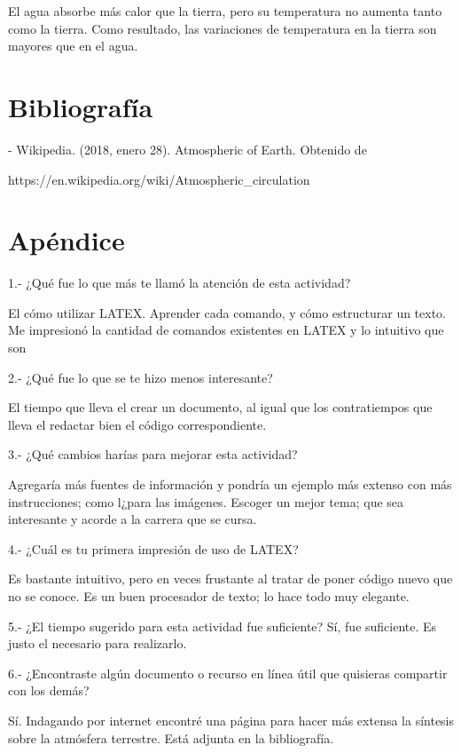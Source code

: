 \documentclass{article} %
\begin{document}
El agua absorbe más calor que la tierra, pero su temperatura no aumenta tanto como la tierra. Como resultado, las variaciones de temperatura en la tierra son mayores que en el agua.



\section{Bibliografía}

- Wikipedia. (2018, enero 28). Atmospheric of Earth. Obtenido de

https://en.wikipedia.org/wiki/Atmospheric\_circulation


\section{Apéndice}



1.- ¿Qué fue lo que más te llamó la atención de esta actividad?

         {\color{red}El cómo utilizar LATEX. Aprender cada comando, y cómo estructurar un texto. Me impresionó la cantidad de comandos existentes en LATEX y lo intuitivo que son}

2.- ¿Qué fue lo que se te hizo menos interesante?

        {\color{red}El tiempo que lleva el crear un documento, al igual que los contratiempos que lleva el redactar bien el código correspondiente.}

3.- ¿Qué cambios harías para mejorar esta actividad?

        {\color{red}Agregaría más fuentes de información y pondría un ejemplo más extenso con más instrucciones; como l¿para las imágenes. Escoger un mejor tema; que sea interesante y acorde a la carrera que se cursa.}

4.- ¿Cuál es tu primera impresión de uso de LATEX?

        {\color{red}Es bastante intuitivo, pero en veces frustante al tratar de poner código nuevo que no se conoce. Es un buen procesador de texto; lo hace todo muy elegante.}

5.- ¿El tiempo sugerido para esta actividad fue suficiente?
        {\color{red}Sí, fue suficiente. Es justo el necesario para realizarlo.}

6.- ¿Encontraste algún documento o recurso en línea útil que quisieras compartir con los demás?

        {\color{red}Sí. Indagando por internet encontré una página para hacer más extensa la síntesis sobre la atmósfera terrestre. Está adjunta en la bibliografía.}
\end{document}
